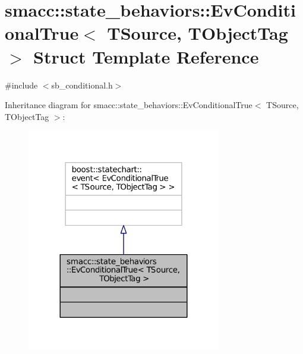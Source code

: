 \hypertarget{structsmacc_1_1state__behaviors_1_1EvConditionalTrue}{}\section{smacc\+:\+:state\+\_\+behaviors\+:\+:Ev\+Conditional\+True$<$ T\+Source, T\+Object\+Tag $>$ Struct Template Reference}
\label{structsmacc_1_1state__behaviors_1_1EvConditionalTrue}


{\ttfamily \#include $<$sb\+\_\+conditional.\+h$>$}



Inheritance diagram for smacc\+:\+:state\+\_\+behaviors\+:\+:Ev\+Conditional\+True$<$ T\+Source, T\+Object\+Tag $>$\+:
\nopagebreak
\begin{figure}[H]
\begin{center}
\leavevmode
\includegraphics[width=240pt]{structsmacc_1_1state__behaviors_1_1EvConditionalTrue__inherit__graph}
\end{center}
\end{figure}



